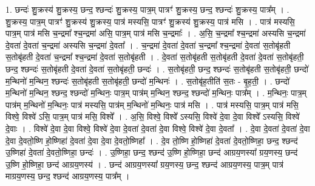 \documentclass[17pt]{extarticle}
\begin{document}
1. छन्दः॑ शु॒क्रस्य॑ शु॒क्रस्य॒ छन्द॒ श्छन्दः॑ शु॒क्रस्य॒ पात्र॒म् पात्रꣳ॑ शु॒क्रस्य॒ छन्द॒ श्छन्दः॑ शु॒क्रस्य॒ पात्र᳚म् । . शु॒क्रस्य॒ पात्र॒म् पात्रꣳ॑ शु॒क्रस्य॑ शु॒क्रस्य॒ पात्र॑ मस्यसि॒ पात्रꣳ॑ शु॒क्रस्य॑ शु॒क्रस्य॒ पात्र॑ मसि । . पात्र॑ मस्यसि॒ पात्र॒म् पात्र॑ मसि च॒न्द्रमा᳚ श्च॒न्द्रमा॑ असि॒ पात्र॒म् पात्र॑ मसि च॒न्द्रमाः᳚ । . अ॒सि॒ च॒न्द्रमा᳚ श्च॒न्द्रमा॑ अस्यसि च॒न्द्रमा॑ दे॒वता॑ दे॒वता॑ च॒न्द्रमा॑ अस्यसि च॒न्द्रमा॑ दे॒वता᳚ । . च॒न्द्रमा॑ दे॒वता॑ दे॒वता॑ च॒न्द्रमा᳚ श्च॒न्द्रमा॑ दे॒वता॑ स॒तोबृ॑हती स॒तोबृ॑हती दे॒वता॑ च॒न्द्रमा᳚ श्च॒न्द्रमा॑ दे॒वता॑ स॒तोबृ॑हती । . दे॒वता॑ स॒तोबृ॑हती स॒तोबृ॑हती दे॒वता॑ दे॒वता॑ स॒तोबृ॑हती॒ छन्द॒ श्छन्दः॑ स॒तोबृ॑हती दे॒वता॑ दे॒वता॑ स॒तोबृ॑हती॒ छन्दः॑ । . स॒तोबृ॑हती॒ छन्द॒ श्छन्दः॑ स॒तोबृ॑हती स॒तोबृ॑हती॒ छन्दो॑ म॒न्थिनो॑ म॒न्थिन॒ श्छन्दः॑ स॒तोबृ॑हती स॒तोबृ॑हती॒ छन्दो॑ म॒न्थिनः॑ । . स॒तोबृ॑ह॒तीति॑ स॒तः - बृ॒ह॒ती॒ । . छन्दो॑ म॒न्थिनो॑ म॒न्थिन॒ श्छन्द॒ श्छन्दो॑ म॒न्थिनः॒ पात्र॒म् पात्र॑म् म॒न्थिन॒ श्छन्द॒ श्छन्दो॑ म॒न्थिनः॒ पात्र᳚म् । . म॒न्थिनः॒ पात्र॒म् पात्र॑म् म॒न्थिनो॑ म॒न्थिनः॒ पात्र॑ मस्यसि॒ पात्र॑म् म॒न्थिनो॑ म॒न्थिनः॒ पात्र॑ मसि । . पात्र॑ मस्यसि॒ पात्र॒म् पात्र॑ मसि॒ विश्वे॒ विश्वे॑ ऽसि॒ पात्र॒म् पात्र॑ मसि॒ विश्वे᳚ । . अ॒सि॒ विश्वे॒ विश्वे᳚ ऽस्यसि॒ विश्वे॑ दे॒वा दे॒वा विश्वे᳚ ऽस्यसि॒ विश्वे॑ दे॒वाः । . विश्वे॑ दे॒वा दे॒वा विश्वे॒ विश्वे॑ दे॒वा दे॒वता॑ दे॒वता॑ दे॒वा विश्वे॒ विश्वे॑ दे॒वा दे॒वता᳚ । . दे॒वा दे॒वता॑ दे॒वता॑ दे॒वा दे॒वा दे॒वतो॒ष्णि हो॒ष्णिहा॑ दे॒वता॑ दे॒वा दे॒वा दे॒वतो॒ष्णिहा᳚ । . दे॒व तो॒ष्णि हो॒ष्णिहा॑ दे॒वता॑ दे॒वतो॒ष्णिहा॒ छन्द॒ श्छन्द॑ उ॒ष्णिहा॑ दे॒वता॑ दे॒वतो॒ष्णिहा॒ छन्दः॑ । . उ॒ष्णिहा॒ छन्द॒ श्छन्द॑ उ॒ष्णि हो॒ष्णिहा॒ छन्द॑ आग्रय॒णस्या᳚ ग्रय॒णस्य॒ छन्द॑ उ॒ष्णि हो॒ष्णिहा॒ छन्द॑ आग्रय॒णस्य॑ । . छन्द॑ आग्रय॒णस्या᳚ ग्रय॒णस्य॒ छन्द॒ श्छन्द॑ आग्रय॒णस्य॒ पात्र॒म् पात्र॑ माग्रय॒णस्य॒ छन्द॒ श्छन्द॑ आग्रय॒णस्य॒ पात्र᳚म् । \newline
\end{document}
